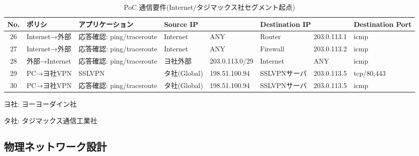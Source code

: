 \begin{landscape}
 \begin{table}[h]
  \centering
  \caption{PoC 通信要件(Internet/タジマックス社セグメント起点)}
  \label{tab:poc-requires-etc}
  \begin{threeparttable}
   \begin{tabularx}{\linewidth}{c|X|X|X|X|X|X|X}
\hline
No. & ポリシ & アプリケーション & \multicolumn{2}{|l|}{Source IP} & \multicolumn{2}{l|}{Destination IP} & Destination Port \\
\hline
\hline
26 & Internet→外部 & 応答確認: ping/traceroute & Internet & ANY & Router & 203.0.113.1 & icmp \\ \hline
27 & Internet→外部 & 応答確認: ping/traceroute & Internet & ANY & Firewall & 203.0.113.2 & icmp \\ \hline
28 & 外部→Internet & 応答確認: ping/traceroute & ヨ社外部 & 203.0.113.0/29 & Internet & ANY & icmp \\ \hline
29 & PC→ヨ社VPN & SSLVPN & タ社(Global) & 198.51.100.94 & SSLVPNサーバ & 203.0.113.5 & tcp/80,443 \\ \hline
30 & PC→ヨ社VPN & 応答確認: ping/traceroute & タ社(Global) & 198.51.100.94 & SSLVPNサーバ & 203.0.113.5 & icmp \\ \hline
   \end{tabularx}
   \begin{tablenotes}
    \footnotesize
    \item ヨ社: ヨーヨーダイン社
    \item タ社: タジマックス通信工業社
   \end{tablenotes}
  \end{threeparttable}
 \end{table}
\end{landscape}

  \subsection{物理ネットワーク設計}
  \label{sec:physical_nw_design}

